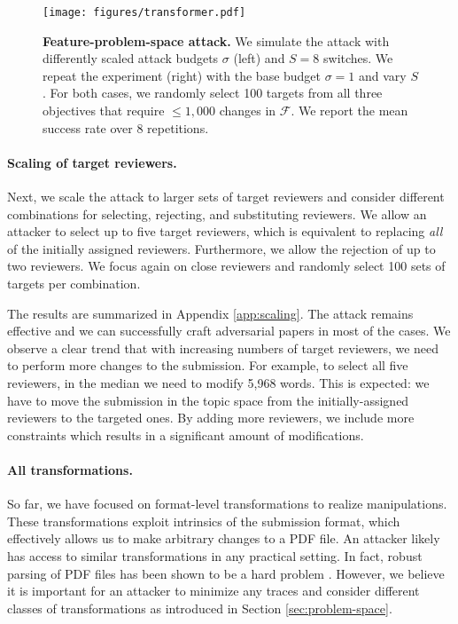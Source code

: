 \documentclass[letterpaper,twocolumn,10pt]{article}
\newcommand{\switches}{S}
\newcommand{\attackbudgetscale}{\sigma}
\newcommand{\F}{\ensuremath{\mathcal{F}}\xspace}
\begin{document}
\begin{figure}[t]
    \centering
  	\texttt{[image: figures/transformer.pdf]}
\caption{\textbf{Feature-problem-space attack.} We simulate the attack with differently scaled attack budgets $\attackbudgetscale$ (left) and $\switches = 8$ switches. We repeat the experiment (right) with the base budget $\sigma = 1$ and vary $\switches$. For both cases, we randomly select 100 targets from all three objectives that require $\leq 1,000$ changes in $\F$. We report the mean success rate over 8 repetitions.}
    \label{fig:transformer}
\end{figure} \paragraph{Scaling of target reviewers.}
Next, we scale the attack to larger sets of target reviewers and consider different combinations for selecting, rejecting, and substituting reviewers. We allow an attacker to select up to five target reviewers, which is equivalent to replacing \emph{all} of the initially assigned reviewers. Furthermore, we allow the rejection of up to two reviewers. We focus again on close reviewers and randomly select 100 sets of targets per combination.

The results are summarized in Appendix \ref{app:scaling}. The attack remains effective and we can successfully craft adversarial papers in most of the cases. 
We observe a clear trend that with increasing numbers of target reviewers, we need to perform more changes to the submission. For example, to select all five reviewers, in the median we need to modify 5,968 words. This is expected: we have to move the submission in the topic space from the initially-assigned reviewers to the targeted ones. By adding more reviewers, we include more constraints which results in a significant amount of modifications.

\paragraph{All transformations.}
So far, we have focused on format-level transformations to realize manipulations. These transformations exploit intrinsics of the submission format, which effectively allows us to make arbitrary changes to a PDF file. An attacker likely has access to similar transformations in any practical setting. In fact, robust parsing of PDF files has been shown to be a hard problem \citep[e.g.,][]{carmony-16-extract}. However, we believe it is important for an attacker to minimize any traces and consider different classes of transformations as introduced in Section \ref{sec:problem-space}.
\end{document}
